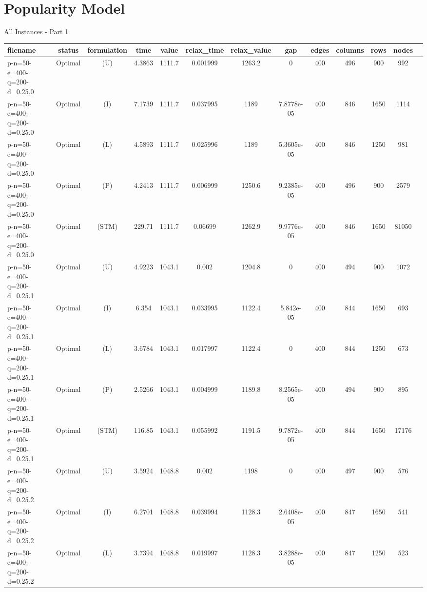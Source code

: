 \documentclass[landscape, a4paper]{article}
\newcommand{\STM}{\ensuremath{\mathrm{STM}}}
\newcommand{\Improved}{\ensuremath{\mathrm{I}}}
\newcommand{\Loose}{\ensuremath{\mathrm{L}}}
\newcommand{\Profit}{\ensuremath{\mathrm{P}}}
\newcommand{\Utility}{\ensuremath{\mathrm{U}}}
\begin{document}
\section{Popularity Model}
\begin{center}
All Instances - Part 1

\begin{tabular}{lcccccccccccc}
filename & status & formulation & time & value & relax\_time & relax\_value & gap & edges & columns & rows & nodes & \\
\hline
p-n=50-e=400-q=200-d=0.25.0 & Optimal & (\Utility) & 4.3863 & 1111.7 & 0.001999 & 1263.2 & 0 & 400 & 496 & 900 & 992 & \\
p-n=50-e=400-q=200-d=0.25.0 & Optimal & (\Improved) & 7.1739 & 1111.7 & 0.037995 & 1189 & 7.8778e-05 & 400 & 846 & 1650 & 1114 & \\
p-n=50-e=400-q=200-d=0.25.0 & Optimal & (\Loose) & 4.5893 & 1111.7 & 0.025996 & 1189 & 5.3605e-05 & 400 & 846 & 1250 & 981 & \\
p-n=50-e=400-q=200-d=0.25.0 & Optimal & (\Profit) & 4.2413 & 1111.7 & 0.006999 & 1250.6 & 9.2385e-05 & 400 & 496 & 900 & 2579 & \\
p-n=50-e=400-q=200-d=0.25.0 & Optimal & (\STM) & 229.71 & 1111.7 & 0.06699 & 1262.9 & 9.9776e-05 & 400 & 846 & 1650 & 81050 & \\
p-n=50-e=400-q=200-d=0.25.1 & Optimal & (\Utility) & 4.9223 & 1043.1 & 0.002 & 1204.8 & 0 & 400 & 494 & 900 & 1072 & \\
p-n=50-e=400-q=200-d=0.25.1 & Optimal & (\Improved) & 6.354 & 1043.1 & 0.033995 & 1122.4 & 5.842e-05 & 400 & 844 & 1650 & 693 & \\
p-n=50-e=400-q=200-d=0.25.1 & Optimal & (\Loose) & 3.6784 & 1043.1 & 0.017997 & 1122.4 & 0 & 400 & 844 & 1250 & 673 & \\
p-n=50-e=400-q=200-d=0.25.1 & Optimal & (\Profit) & 2.5266 & 1043.1 & 0.004999 & 1189.8 & 8.2565e-05 & 400 & 494 & 900 & 895 & \\
p-n=50-e=400-q=200-d=0.25.1 & Optimal & (\STM) & 116.85 & 1043.1 & 0.055992 & 1191.5 & 9.7872e-05 & 400 & 844 & 1650 & 17176 & \\
p-n=50-e=400-q=200-d=0.25.2 & Optimal & (\Utility) & 3.5924 & 1048.8 & 0.002 & 1198 & 0 & 400 & 497 & 900 & 576 & \\
p-n=50-e=400-q=200-d=0.25.2 & Optimal & (\Improved) & 6.2701 & 1048.8 & 0.039994 & 1128.3 & 2.6408e-05 & 400 & 847 & 1650 & 541 & \\
p-n=50-e=400-q=200-d=0.25.2 & Optimal & (\Loose) & 3.7394 & 1048.8 & 0.019997 & 1128.3 & 3.8288e-05 & 400 & 847 & 1250 & 523 & \\

\end{tabular}
\end{center}
\end{document}
